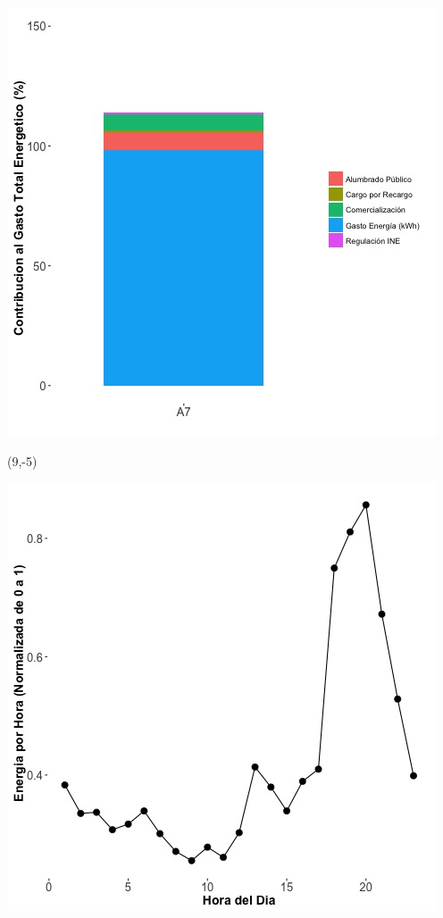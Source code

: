\documentclass{article}\usepackage[]{graphicx}\usepackage[]{color}
\newenvironment{knitrout}{}{} %
\begin{document}
\begin{knitrout}
\color{fgcolor}
\includegraphics[scale=0.65]{figure/A7_costvars_plot.jpg} 
\end{knitrout}

 \begin{textblock}{1}(9,-5)
\begin{minipage}{20em}
\begingroup

\endgroup
\end{minipage}
\end{textblock}

\begin{knitrout}
\color{fgcolor}
\includegraphics[scale=0.65]{figure/A7_plot_norm_median} 
\end{knitrout}
\end{document}
